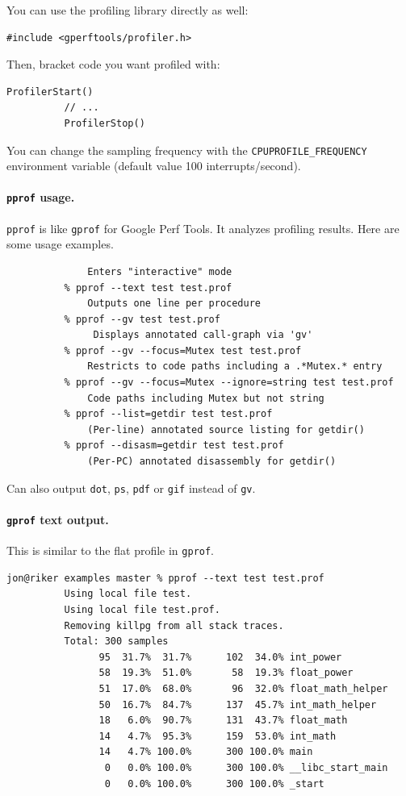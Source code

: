 \documentclass[a4paper]{report}
\begin{document}
You can use the profiling library directly as well:
\begin{lstlisting}[basicstyle=\scriptsize]
          #include <gperftools/profiler.h>
\end{lstlisting}
Then, bracket code you want profiled with:
\begin{lstlisting}[basicstyle=\scriptsize]
          ProfilerStart()
          // ...
          ProfilerStop()
\end{lstlisting}
    
You can change the sampling frequency with the {\tt CPUPROFILE\_FREQUENCY} environment variable
(default value 100 interrupts/second).

\paragraph{{\tt pprof} usage.} {\tt pprof} is like {\tt gprof} for Google Perf Tools. It
analyzes profiling results. Here are some usage examples.
  \begin{lstlisting}[basicstyle=\scriptsize]
          % pprof test test.prof
              Enters "interactive" mode
          % pprof --text test test.prof
              Outputs one line per procedure
          % pprof --gv test test.prof
               Displays annotated call-graph via 'gv'
          % pprof --gv --focus=Mutex test test.prof
              Restricts to code paths including a .*Mutex.* entry
          % pprof --gv --focus=Mutex --ignore=string test test.prof
              Code paths including Mutex but not string
          % pprof --list=getdir test test.prof
              (Per-line) annotated source listing for getdir()
          % pprof --disasm=getdir test test.prof
              (Per-PC) annotated disassembly for getdir()
  \end{lstlisting}

Can also output {\tt dot}, {\tt ps}, {\tt pdf} or {\tt gif} instead of {\tt gv}.

\paragraph{{\tt gprof} text output.}
This is similar to the flat profile in {\tt gprof}.

  \begin{lstlisting}[basicstyle=\scriptsize]
          jon@riker examples master % pprof --text test test.prof 
          Using local file test.
          Using local file test.prof.
          Removing killpg from all stack traces.
          Total: 300 samples
                95  31.7%  31.7%      102  34.0% int_power
                58  19.3%  51.0%       58  19.3% float_power
                51  17.0%  68.0%       96  32.0% float_math_helper
                50  16.7%  84.7%      137  45.7% int_math_helper
                18   6.0%  90.7%      131  43.7% float_math
                14   4.7%  95.3%      159  53.0% int_math
                14   4.7% 100.0%      300 100.0% main
                 0   0.0% 100.0%      300 100.0% __libc_start_main
                 0   0.0% 100.0%      300 100.0% _start
  \end{lstlisting}
\end{document}
